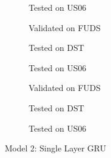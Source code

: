 \begin{figure}[htbp]
\begin{subfigure}[b]{0.33\textwidth}
        \caption{Tested on US06}
    \end{subfigure}
    \begin{subfigure}[b]{0.32\textwidth}
        \centering
        
        \caption{Validated on FUDS}
    \end{subfigure}
    \hfill
    \begin{subfigure}[b]{0.33\textwidth}
        \centering
        
        \caption{Tested on DST}
    \end{subfigure}
    \hfill
    \begin{subfigure}[b]{0.33\textwidth}
        \centering
        
        \caption{Tested on US06}
    \end{subfigure}
        \begin{subfigure}[b]{0.32\textwidth}
        \centering
        
        \caption{Validated on FUDS}
    \end{subfigure}
    \hfill
    \begin{subfigure}[b]{0.33\textwidth}
        \centering
        
        \caption{Tested on DST}
    \end{subfigure}
    \hfill
    \begin{subfigure}[b]{0.33\textwidth}
        \centering
        
        \caption{Tested on US06}
    \end{subfigure}
    
    \caption{Model 2: Single Layer GRU}
    \label{fig:Model-1}
\end{figure}